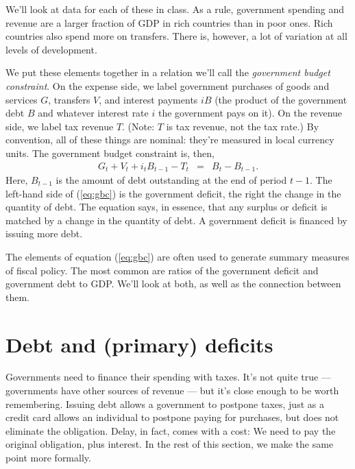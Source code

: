 We'll look at data for each of these in class.
As a rule, government spending and revenue are a larger fraction of GDP
in rich countries than in poor ones.
Rich countries also spend more on transfers.
There is, however, a lot of variation at all levels of development.

We put these elements together in a relation we'll call
the {\it government budget constraint\/}.
On the expense side, we label government purchases of goods and services $G$,
transfers $V$, and interest payments $iB$
(the product of the government debt $B$ and whatever interest rate $i$
the government pays on it).
On the revenue side, we label tax revenue $T$.
(Note: $T$ is tax revenue, not the tax rate.)
By convention, all of these things are nominal:
they're measured in local currency units.
The government budget constraint is, then,
\begin{eqnarray}
    G_t + V_t + i_t B_{t-1} - T_t  &=& B_{t} - B_{t-1} .
    \label{eq:gbc}
\end{eqnarray}
Here, $B_{t-1}$ is the amount of debt outstanding at the end of
period $t-1$.
The left-hand side of (\ref{eq:gbc})
is the government deficit,
the right the change in the quantity of debt.
The equation says, in essence, that any surplus or deficit is matched
by a change in the quantity of debt.
A government deficit is financed by issuing more debt.


The elements of equation (\ref{eq:gbc})
are often used to generate summary measures
of fiscal policy.
The most common are ratios  of
the government deficit and government debt to GDP. 
We'll look at both, as well as the connection between them.


%
\section{Debt and (primary) deficits  }

Governments need to finance their spending with taxes.
It's not quite true --- governments have other sources of revenue --- but it's close enough to be worth remembering.
Issuing debt allows a government to postpone taxes,
just as a credit card allows an individual to postpone paying
for purchases,
but does not eliminate the obligation.
Delay, in fact, comes with a cost:  We need to pay the original
obligation, plus interest.
In the rest of this section, we make the same point more formally.


